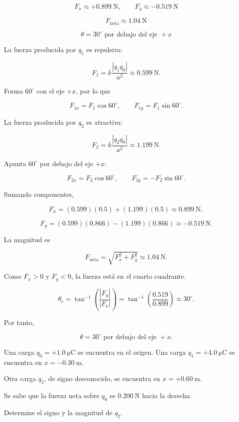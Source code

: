 \begin{respuesta}
\[
\boxed{F_x\approx+\SI{0.899}{\newton}}, \qquad
\boxed{F_y\approx-\SI{0.519}{\newton}}
\]

\[
\boxed{F_{\text{neta}}\approx\SI{1.04}{\newton}}
\]

\[
\boxed{\theta=30^\circ\text{ por debajo del eje }+x}
\]
\end{respuesta}

\begin{explicacion}
La fuerza producida por \(q_1\) es repulsiva:

\[
F_1=k\frac{|q_1q_0|}{a^2}
\approx\SI{0.599}{\newton}.
\]

Forma \(60^\circ\) con el eje \(+x\), por lo que

\[
F_{1x}=F_1\cos60^\circ, \qquad
F_{1y}=F_1\sin60^\circ.
\]

La fuerza producida por \(q_2\) es atractiva:

\[
F_2=k\frac{|q_2q_0|}{a^2}
\approx\SI{1.199}{\newton}.
\]

Apunta \(60^\circ\) por debajo del eje \(+x\):

\[
F_{2x}=F_2\cos60^\circ, \qquad
F_{2y}=-F_2\sin60^\circ.
\]

Sumando componentes,

\[
F_x=(0.599)(0.5)+(1.199)(0.5)
\approx\SI{0.899}{\newton},
\]

\[
F_y=(0.599)(0.866)-(1.199)(0.866)
\approx-\SI{0.519}{\newton}.
\]

La magnitud es

\[
F_{\text{neta}}
=
\sqrt{F_x^2+F_y^2}
\approx\SI{1.04}{\newton}.
\]

Como \(F_x>0\) y \(F_y<0\), la fuerza está en el cuarto cuadrante.

\[
\theta_r=
\tan^{-1}\left(\frac{|F_y|}{|F_x|}\right)
=
\tan^{-1}\left(\frac{0.519}{0.899}\right)
\approx30^\circ.
\]

Por tanto,

\[
\boxed{\theta=30^\circ\text{ por debajo del eje }+x}.
\]
\end{explicacion}


\begin{ejercicio}
Una carga \(q_0=+\SI{1.0}{\micro\coulomb}\) se encuentra en el origen.
Una carga \(q_1=+\SI{4.0}{\micro\coulomb}\) se encuentra en
\(x=-\SI{0.30}{\metre}\).

Otra carga \(q_2\), de signo desconocido, se encuentra en
\(x=+\SI{0.60}{\metre}\).

Se sabe que la fuerza neta sobre \(q_0\) es
\(\SI{0.200}{\newton}\) hacia la derecha.

Determine el signo y la magnitud de \(q_2\).
\end{ejercicio}

